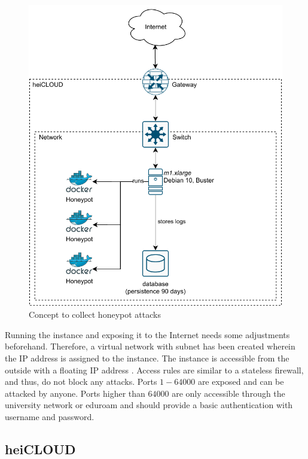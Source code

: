 \begin{figure}[ht]
    \centering
    \includegraphics{figures/tpot-concept.pdf}
    \caption[Draft for data collection]{Concept to collect honeypot attacks}
    \label{fig:concept}
\end{figure}

Running the instance and exposing it to the Internet needs some adjustments beforehand.
Therefore, a virtual network with subnet  has been created wherein the IP address  is assigned to the instance.
The instance is accessible from the outside with a floating IP address .
Access rules are similar to a stateless firewall, and thus, do not block any attacks.
Ports $1-64000$ are exposed and can be attacked by anyone.
Ports higher than $64000$ are only accessible through the university network  or eduroam  and should provide a basic authentication with username and password.

\subsection{heiCLOUD}
\label{subsec:heicloud}

